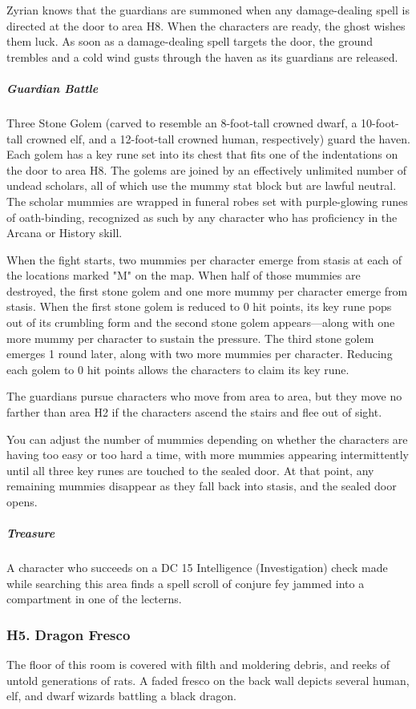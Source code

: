 \documentclass[10pt,a4paper,twoside,bg=print,twocolumn,openany,nodeprecatedcode]{dndbook}
\begin{document}
Zyrian knows that the guardians are summoned when any damage-dealing spell is directed at the door to area H8. When the characters are ready, the ghost wishes them luck. As soon as a damage-dealing spell targets the door, the ground trembles and a cold wind gusts through the haven as its guardians are released.

\subparagraph{Guardian Battle}
Three Stone Golem (carved to resemble an 8-foot-tall crowned dwarf, a 10-foot-tall crowned elf, and a 12-foot-tall crowned human, respectively) guard the haven. Each golem has a key rune set into its chest that fits one of the indentations on the door to area H8. The golems are joined by an effectively unlimited number of undead scholars, all of which use the mummy stat block but are lawful neutral. The scholar mummies are wrapped in funeral robes set with purple-glowing runes of oath-binding, recognized as such by any character who has proficiency in the Arcana or History skill.

When the fight starts, two mummies per character emerge from stasis at each of the locations marked "M" on the map. When half of those mummies are destroyed, the first stone golem and one more mummy per character emerge from stasis. When the first stone golem is reduced to 0 hit points, its key rune pops out of its crumbling form and the second stone golem appears—along with one more mummy per character to sustain the pressure. The third stone golem emerges 1 round later, along with two more mummies per character. Reducing each golem to 0 hit points allows the characters to claim its key rune.

The guardians pursue characters who move from area to area, but they move no farther than area H2 if the characters ascend the stairs and flee out of sight.

You can adjust the number of mummies depending on whether the characters are having too easy or too hard a time, with more mummies appearing intermittently until all three key runes are touched to the sealed door. At that point, any remaining mummies disappear as they fall back into stasis, and the sealed door opens.

\subparagraph{Treasure}
A character who succeeds on a DC 15 Intelligence (Investigation) check made while searching this area finds a spell scroll of conjure fey jammed into a compartment in one of the lecterns.

\subsubsection{H5. Dragon Fresco}
\begin{DndReadAloud}{}
The floor of this room is covered with filth and moldering debris, and reeks of untold generations of rats. A faded fresco on the back wall depicts several human, elf, and dwarf wizards battling a black dragon.

\end{DndReadAloud}
\end{document}

